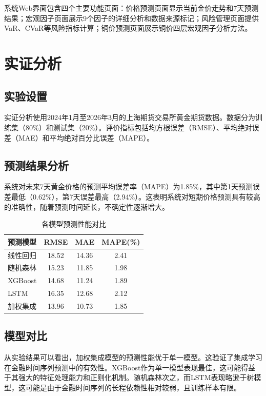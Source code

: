 \documentclass[UTF8,a4paper,12pt]{ctexart}
\begin{document}
系统Web界面包含四个主要功能页面：价格预测页面显示当前金价走势和7天预测结果；宏观因子页面展示9个因子的详细分析和数据来源标记；风险管理页面提供VaR、CVaR等风险指标计算；铜价预测页面展示铜价四层宏观因子分析方法。

\section{实证分析}

\subsection{实验设置}

实证分析使用2024年1月至2026年3月的上海期货交易所黄金期货数据。数据分为训练集（80\%）和测试集（20\%）。评价指标包括均方根误差（RMSE）、平均绝对误差（MAE）和平均绝对百分比误差（MAPE）。

\subsection{预测结果分析}

系统对未来7天黄金价格的预测平均误差率（MAPE）为1.85\%，其中第1天预测误差最低（0.62\%），第7天误差最高（2.94\%）。这表明系统对短期价格预测具有较高的准确性，随着预测时间延长，不确定性逐渐增大。

\begin{table}[htbp]
\centering
\caption{各模型预测性能对比}
\label{tab:model-compare}
\begin{tabular}{lccc}
\toprule
\textbf{预测模型} & \textbf{RMSE} & \textbf{MAE} & \textbf{MAPE(\%)} \\
\midrule
线性回归 & 18.52 & 14.36 & 2.41 \\
随机森林 & 15.23 & 11.85 & 1.98 \\
XGBoost & 14.68 & 11.24 & 1.89 \\
LSTM & 16.35 & 12.68 & 2.12 \\
加权集成 & 13.96 & 10.73 & 1.85 \\
\bottomrule
\end{tabular}
\end{table}

\subsection{模型对比}

从实验结果可以看出，加权集成模型的预测性能优于单一模型。这验证了集成学习在金融时间序列预测中的有效性。XGBoost作为单一模型表现最佳，这可能得益于其强大的特征处理能力和正则化机制。随机森林次之，而LSTM表现略逊于树模型，这可能是由于金融时间序列的长程依赖性相对较弱，且训练样本有限。
\end{document}
